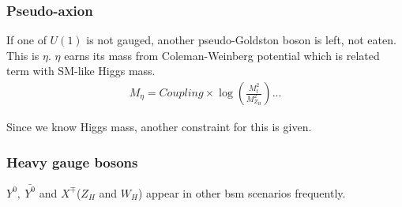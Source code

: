 \subsubsection*{Pseudo-axion}
\cite{Kilian:2004pp} 
If one of $U(1)$ is not gauged, another pseudo-Goldston boson is left, not eaten.
This is $\eta$. 
$\eta$ earns its mass from Coleman-Weinberg potential which is related term 
with SM-like Higgs mass. 
\begin{align}
 M_\eta = Coupling\times \log (\frac{M_t^2}{M_{Z_H}^2}) ...
\end{align}

Since we know Higgs mass, another constraint for this is given. 



\subsubsection*{Heavy gauge bosons}

$Y^0,~\bar{Y^0}$ and $X^\mp$($Z_H$ and $W_H$) appear in other bsm scenarios frequently. 

